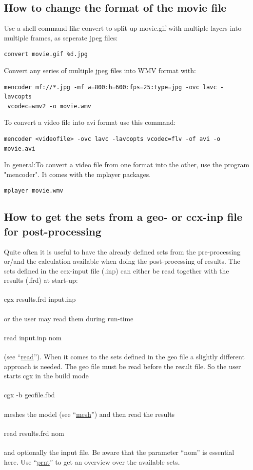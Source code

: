 \documentclass{article}
\providecommand{\htmlref}[2]{\hyperref[#2]{#1}}
\begin{document}
\begin{appendix}
\subsection{\label{How to change the format of the movie file}How to change the format of the movie file}
Use a shell command like convert to split up movie.gif with multiple
layers into multiple frames, as seperate jpeg files:
\begin{verbatim}
convert movie.gif %d.jpg
\end{verbatim}
Convert any series of multiple jpeg files into WMV format with:
\begin{verbatim}
mencoder mf://*.jpg -mf w=800:h=600:fps=25:type=jpg -ovc lavc -lavcopts
 vcodec=wmv2 -o movie.wmv
\end{verbatim}
To convert a video file into avi format use this command:
\begin{verbatim}
mencoder <videofile> -ovc lavc -lavcopts vcodec=flv -of avi -o movie.avi
\end{verbatim}
In general:To convert a video file from one format into the other, use
the program "mencoder". It comes with the mplayer packages. 
\begin{verbatim}
mplayer movie.wmv
\end{verbatim}

\subsection{\label{How to get the sets from a geo- or ccx-inp file for post-processing}How to get the sets from a geo- or ccx-inp file for post-processing}
Quite often it is useful to have the already defined sets from the pre-processing or/and the calculation available when doing the post-processing of results. The sets defined in the ccx-input file (.inp) can either be read together with the results (.frd) at start-up:\\\\cgx results.frd input.inp\\\\or the user may read them during run-time\\\\read input.inp nom\\\\ (see ``\htmlref{read}{read}''). When it comes to the sets defined in the geo file a slightly different approach is needed. The geo file must be read before the result file. So the user starts cgx in the build mode\\\\cgx -b geofile.fbd\\\\meshes the model (see ``\htmlref{mesh}{mesh}'') and then read the results\\\\read results.frd nom\\\\and optionally the input file. Be aware that the parameter ``nom'' is essential here. Use ``\htmlref{prnt}{prnt}'' to get an overview over the available sets.


\end{appendix}
\end{document}
